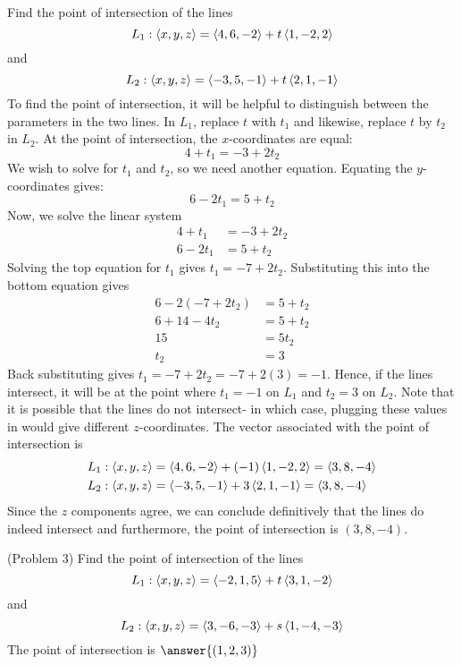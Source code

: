 \documentclass[handout]{ximera}
\begin{document}
\begin{example}[Example 3]
Find the point of intersection of the lines
\[
L_1: \left\langle x, y, z\right\rangle = \left\langle 4, 6, -2\right\rangle + t\left\langle 1, -2, 2\right\rangle
\]
and 
\[
L_2: \left\langle x, y, z\right\rangle = \left\langle -3, 5, -1\right\rangle + t\left\langle 2, 1, -1\right\rangle
\]
To find the point of intersection, it will be helpful to distinguish between the parameters in the two lines.
In $L_1$, replace $t$ with $t_1$ and likewise, replace $t$ by $t_2$ in $L_2$. 
At the point of intersection, the $x$-coordinates are equal:
\[
4+t_1 = -3 + 2t_2
\]
We wish to solve for $t_1$ and $t_2$, so we need another equation. Equating the $y$-coordinates gives:
\[
6 -2t_1 = 5 + t_2
\]
Now, we solve the linear system
\begin{align*}
4+t_1 &= -3 + 2t_2\\
6 -2t_1 &= 5 + t_2
\end{align*}
Solving the top equation for $t_1$ gives $t_1 = -7 + 2t_2$.  Substituting this into the bottom equation gives
\begin{align*}
6 - 2(-7+2t_2) &= 5 + t_2\\
6 + 14 - 4t_2 & = 5 + t_2\\
15 &= 5t_2\\
t_2 &=3
\end{align*}
Back substituting gives $t_1 = -7 + 2t_2 = -7 + 2(3) = -1$.
Hence, if the lines intersect, it will be at the point where $t_1 = -1$ on $L_1$ and $t_2 = 3$ on $L_2$.
Note that it is possible that the lines do not intersect- in which case, plugging these values in would 
give different $z$-coordinates.
The vector associated with the point of intersection is
\begin{align*}
L_1: \left\langle x, y, z\right\rangle &= \left\langle 4, 6, -2\right\rangle + (-1)\left\langle 1, -2, 2\right\rangle = \left\langle 3, 8, -4\right\rangle\\
L_2: \left\langle x, y, z\right\rangle &= \left\langle -3, 5, -1\right\rangle + 3\left\langle 2, 1, -1\right\rangle = \left\langle 3, 8, -4\right\rangle
\end{align*}
Since the $z$ components agree, we can conclude definitively that the lines do indeed intersect and furthermore, 
the point of intersection is $(3, 8, -4)$.
\end{example}

\begin{problem}(Problem 3)
Find the point of intersection of the lines
\[
L_1: \left\langle x, y, z\right\rangle = \left\langle -2, 1, 5\right\rangle + t\left\langle 3, 1, -2\right\rangle
\]
and 
\[
L_2: \left\langle x, y, z\right\rangle = \left\langle 3, -6, -3\right\rangle + s\left\langle 1, -4, -3\right\rangle
\]
The point of intersection is $\answer{(1, 2, 3)}$
\end{problem}
\end{document}
